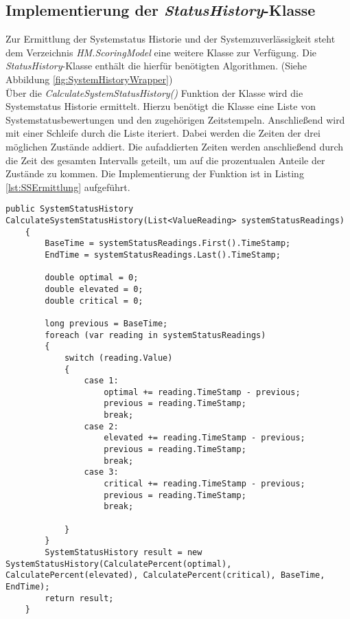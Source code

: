 \subsection{Implementierung der \textit{StatusHistory}-Klasse}
Zur Ermittlung der Systemstatus Historie und der Systemzuverlässigkeit steht dem Verzeichnis \textit{HM.ScoringModel} eine weitere Klasse zur Verfügung. Die \textit{StatusHistory}-Klasse enthält die hierfür benötigten Algorithmen. (Siehe Abbildung \ref{fig:SystemHistoryWrapper})\\
Über die \textit{CalculateSystemStatusHistory()} Funktion der Klasse wird die Systemstatus Historie ermittelt. Hierzu benötigt die Klasse eine Liste von Systemstatusbewertungen und den zugehörigen Zeitstempeln. Anschließend wird mit einer Schleife durch die Liste iteriert. Dabei werden die Zeiten der drei möglichen Zustände addiert. Die aufaddierten Zeiten werden anschließend durch die Zeit des gesamten Intervalls geteilt, um auf die prozentualen Anteile der Zustände zu kommen. Die Implementierung der Funktion ist in Listing \ref{lst:SSErmittlung} aufgeführt.\\
\begin{lstlisting}[caption={Implementierung der Systemstatus Historie Ermittlung}, label={lst:SSErmittlung}]
    public SystemStatusHistory CalculateSystemStatusHistory(List<ValueReading> systemStatusReadings)
    {
        BaseTime = systemStatusReadings.First().TimeStamp;
        EndTime = systemStatusReadings.Last().TimeStamp;

        double optimal = 0;
        double elevated = 0;
        double critical = 0;

        long previous = BaseTime;
        foreach (var reading in systemStatusReadings)
        {
            switch (reading.Value)
            {
                case 1:
                    optimal += reading.TimeStamp - previous;
                    previous = reading.TimeStamp;
                    break;
                case 2:
                    elevated += reading.TimeStamp - previous;
                    previous = reading.TimeStamp;
                    break;
                case 3:
                    critical += reading.TimeStamp - previous;
                    previous = reading.TimeStamp;
                    break;

            }
        }
        SystemStatusHistory result = new SystemStatusHistory(CalculatePercent(optimal), CalculatePercent(elevated), CalculatePercent(critical), BaseTime, EndTime);
        return result;
    }\end{lstlisting}
